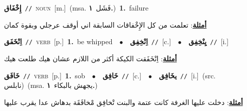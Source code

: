\documentclass[10pt,a4paper,twoside]{article} %
\begin{document}
\begin{multicols}{2}
{\setlength\topsep{0pt}\textbf{\foreignlanguage{arabic}{إِخْفَاق}}\ {\color{gray}\texttt{//}\color{black}}\ \textsc{noun}\ [m.]\ \color{gray}(msa. \foreignlanguage{arabic}{فَشَل}~\foreignlanguage{arabic}{\textbf{١.}})\color{black}\ \textbf{1.}~failure\  \begin{flushright}\color{gray}\foreignlanguage{arabic}{\textbf{\underline{\foreignlanguage{arabic}{أمثلة}}}: تعلمت من كل الإِخْفاقات السابقة اني أوقف عرجلي وبقوة كمان}\end{flushright}\color{black}} \vspace{2mm}

{\setlength\topsep{0pt}\textbf{\foreignlanguage{arabic}{اِنْخَفَق}}\ {\color{gray}\texttt{//}\color{black}}\ \textsc{verb}\ [p.]\ \textbf{1.}~be whipped\ \ $\bullet$\ \ \setlength\topsep{0pt}\textbf{\foreignlanguage{arabic}{اِنْخِفِق}}\ {\color{gray}\texttt{//}\color{black}}\ [c.]\ \ $\bullet$\ \ \setlength\topsep{0pt}\textbf{\foreignlanguage{arabic}{يِنْخِفِق}}\ {\color{gray}\texttt{//}\color{black}}\ [i.]\  \begin{flushright}\color{gray}\foreignlanguage{arabic}{\textbf{\underline{\foreignlanguage{arabic}{أمثلة}}}: اِنْخَفَقت الكيكة أكثر من اللازم عشان هيك طلعت هيك}\end{flushright}\color{black}} \vspace{2mm}

{\setlength\topsep{0pt}\textbf{\foreignlanguage{arabic}{خَافَق}}\ {\color{gray}\texttt{//}\color{black}}\ \textsc{verb}\ [p.]\ \textbf{1.}~sob\ \ $\bullet$\ \ \setlength\topsep{0pt}\textbf{\foreignlanguage{arabic}{خَافِق}}\ {\color{gray}\texttt{//}\color{black}}\ [c.]\ \ $\bullet$\ \ \setlength\topsep{0pt}\textbf{\foreignlanguage{arabic}{يخَافِق}}\ {\color{gray}\texttt{//}\color{black}}\ [i.]\ (src. \color{gray}\foreignlanguage{arabic}{نابلس}\color{black})\ \color{gray}(msa. \foreignlanguage{arabic}{يجهش بالبكاء}~\foreignlanguage{arabic}{\textbf{١.}})\color{black}\  \begin{flushright}\color{gray}\foreignlanguage{arabic}{\textbf{\underline{\foreignlanguage{arabic}{أمثلة}}}: دخلت عليها الغرفة كانت عتمة والبنت تْخافِق مْخافَقَة بدهاش عدا يقرب عليها}\end{flushright}\color{black}} \vspace{2mm}


\end{multicols}
\end{document}
